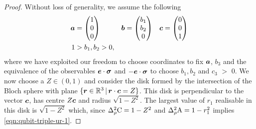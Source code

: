\begin{proof}
Without loss of generality, we assume the following
\begin{align}
  \bm{a} &= \begin{pmatrix}1\\0\\0\end{pmatrix} &&
                                                 \bm{b} = \begin{pmatrix}b_1\\b_2\\0\end{pmatrix} &&
  \bm{c} = \begin{pmatrix}0\\0\\1\end{pmatrix}\\
  1 &> b_1, b_2 > 0,
\end{align}
where we have exploited our freedom to choose coordinates to fix $\bm{a}$, $b_3$ and the equivalence of the observables $\bm{e}\cdot{\boldsymbol\sigma}$ and $-\bm{e}\cdot{\boldsymbol\sigma}$ to choose $b_1, b_2$ and $c_3$ $>$ 0. We now choose a $Z\in (0,1)$ and consider the disk formed by the intersection of the Bloch sphere with plane $\{\bm{r}\in\mathbb{R}^3\,|\,\bm{r}\cdot\bm{c} = Z\}$. This disk is perpendicular to the vector $\bm{c}$, has centre $Z \bm{c}$ and radius $\sqrt{1-Z^2}$. The largest value of $r_1$ realisable in this disk is $\sqrt{1-Z^2}$ which, since $\varr{\opc} = 1-Z^2$ and $\varr{\opa} = 1-r_1^2$ implies \eqref{eqn:qubit-triple-ur-1}.


\end{proof}
